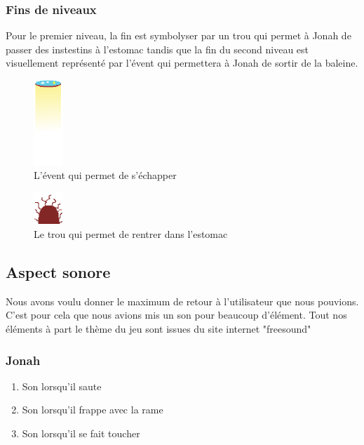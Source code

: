 \documentclass{prologArticle}
\begin{document}
\subsubsection{Fins de niveaux}

Pour le premier niveau, la fin est symbolyser par un trou qui permet à Jonah de passer des instestins à l'estomac tandis que la fin du second niveau est visuellement représenté par l'évent qui permettera à Jonah de sortir de la baleine.

\begin{figure}[H]
    \centering
    \includegraphics[width=0.1\textwidth]{res/ovent.png}
    \caption{L'évent qui permet de s'échapper}
\end{figure}

\begin{figure}[H]
    \centering
    \includegraphics[width=0.1\textwidth]{res/door.png}
    \caption{Le trou qui permet de rentrer dans l'estomac}
\end{figure}

\subsection{Aspect sonore}
Nous avons voulu donner le maximum de retour à l'utilisateur que nous pouvions. C'est pour cela que nous avions mis un son pour beaucoup d'élément. Tout nos éléments à part le thème du jeu sont issues du site internet "freesound"

\subsubsection{Jonah}
\begin{enumerate}
    \item Son lorsqu'il saute
    \item Son lorsqu'il frappe avec la rame
    \item Son lorsqu'il se fait toucher
\end{enumerate}
\end{document}

